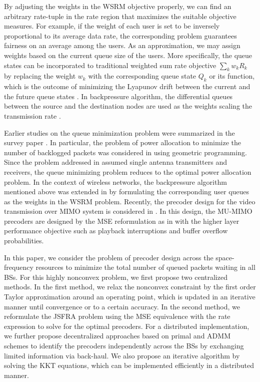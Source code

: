By adjusting the weights in the \ac{WSRM} objective properly, we can find an arbitrary rate-tuple in the rate region that maximizes the suitable objective measures. For example, if the weight of each user is set to be inversely proportional to its average data rate, the corresponding problem guarantees fairness on an average among the users. As an approximation, we may assign weights based on the current queue size of the users. More specifically, the queue states can be incorporated to traditional weighted sum rate objective $\sum_k w_k R_k$ by replacing the weight $w_k$ with the corresponding queue state $Q_k$ or its function, which is the outcome of minimizing the Lyapunov drift between the current and the future queue states \cite{tassiulas,neely2010stochastic}. In backpressure algorithm, the differential queues between the source and the destination nodes are used as the weights scaling the transmission rate \cite{georgiadis2006resource}.

Earlier studies on the queue minimization problem were summarized in the survey paper \cite{berry2004cross,layering_as_opt}. In particular, the problem of power allocation to minimize the number of backlogged packets was considered in \cite{qps_cioffi} using geometric programming. Since the problem addressed in \cite{qps_cioffi} assumed single antenna transmitters and receivers, the queue minimizing problem reduces to the optimal power allocation problem. In the context of wireless networks, the backpressure algorithm mentioned above was extended in \cite{weeraddana2011resource} by formulating the corresponding user queues as the weights in the \ac{WSRM} problem. Recently, the precoder design for the video transmission over \ac{MIMO} system is considered in \cite{video_queues}. In this design, the \ac{MU}-\ac{MIMO} precoders are designed by the \ac{MSE} reformulation as in \cite{christensen2008weighted} with the higher layer performance objective such as playback interruptions and buffer overflow probabilities.

In this paper, we consider the problem of precoder design across the space-frequency resources to minimize the total number of queued packets waiting in all \acp{BS}. For this highly nonconvex problem, we first propose two centralized methods. In the first method, we relax the nonconvex constraint by the first order Taylor approximation around an operating point, which is updated in an iterative manner until convergence or to a certain accuracy. In the second method, we reformulate the \ac{JSFRA} problem using the \ac{MSE} equivalence with the rate expression to solve for the optimal precoders. For a distributed implementation, we further propose decentralized approaches based on primal and \ac{ADMM} schemes to identify the precoders independently across the \acp{BS} by exchanging limited information via back-haul. We also propose an iterative algorithm by solving the \ac{KKT} equations, which can be implemented efficiently in a distributed manner.

